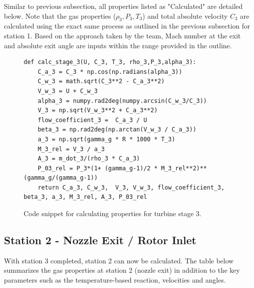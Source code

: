 \documentclass[12pt, letter]{report}
\begin{document}
Similar to previous subsection, all properties listed as "Calculated" are detailed below. Note that the gas properties ($\rho_3, P_3, T_3$) and total absolute velocity $C_3$ are calculated using the exact same process as outlined in the previous subsection for station 1. Based on the approach taken by the team, Mach number at the exit and absolute exit angle are inputs within the range provided in the outline.
\par


\begin{figure}[H]
    \begin{verbatim}
def calc_stage_3(U, C_3, T_3, rho_3,P_3,alpha_3):
    C_a_3 = C_3 * np.cos(np.radians(alpha_3))
    C_w_3 = math.sqrt(C_3**2 - C_a_3**2)
    V_w_3 = U + C_w_3
    alpha_3 = numpy.rad2deg(numpy.arcsin(C_w_3/C_3))
    V_3 = np.sqrt(V_w_3**2 + C_a_3**2)
    flow_coefficient_3 =  C_a_3 / U
    beta_3 = np.rad2deg(np.arctan(V_w_3 / C_a_3))
    a_3 = np.sqrt(gamma_g * R * 1000 * T_3)
    M_3_rel = V_3 / a_3
    A_3 = m_dot_3/(rho_3 * C_a_3)
    P_03_rel = P_3*(1+ (gamma_g-1)/2 * M_3_rel**2)**(gamma_g/(gamma_g-1))
    return C_a_3, C_w_3,  V_3, V_w_3, flow_coefficient_3, beta_3, a_3, M_3_rel, A_3, P_03_rel
    \end{verbatim}
    \caption{Code snippet for calculating properties for turbine stage 3.}
    \label{fig:code_stage_3}
\end{figure}

\par

\subsection{Station 2 - Nozzle Exit / Rotor Inlet}
With station 3 completed, station 2 can now be calculated. 
The table below summarizes the gas properties at station 2 (nozzle exit) in addition to the key parameters such as the temperature-based reaction, velocities and angles. 
\end{document}
